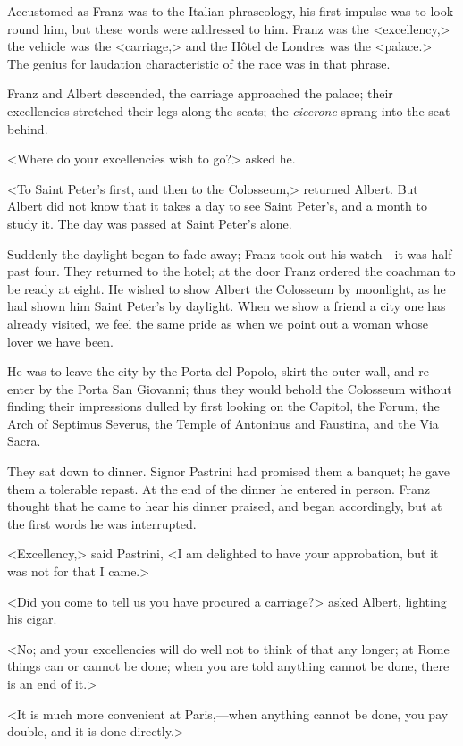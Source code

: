  Accustomed as Franz was to the Italian phraseology, his first impulse was to look round him, but these words were addressed to him. Franz was the <excellency,> the vehicle was the <carriage,> and the Hôtel de Londres was the <palace.> The genius for laudation characteristic of the race was in that phrase. 

 Franz and Albert descended, the carriage approached the palace; their excellencies stretched their legs along the seats; the \textit{cicerone} sprang into the seat behind. 

 <Where do your excellencies wish to go?> asked he. 

 <To Saint Peter's first, and then to the Colosseum,> returned Albert. But Albert did not know that it takes a day to see Saint Peter's, and a month to study it. The day was passed at Saint Peter's alone. 

 Suddenly the daylight began to fade away; Franz took out his watch—it was half-past four. They returned to the hotel; at the door Franz ordered the coachman to be ready at eight. He wished to show Albert the Colosseum by moonlight, as he had shown him Saint Peter's by daylight. When we show a friend a city one has already visited, we feel the same pride as when we point out a woman whose lover we have been. 

 He was to leave the city by the Porta del Popolo, skirt the outer wall, and re-enter by the Porta San Giovanni; thus they would behold the Colosseum without finding their impressions dulled by first looking on the Capitol, the Forum, the Arch of Septimus Severus, the Temple of Antoninus and Faustina, and the Via Sacra. 

 They sat down to dinner. Signor Pastrini had promised them a banquet; he gave them a tolerable repast. At the end of the dinner he entered in person. Franz thought that he came to hear his dinner praised, and began accordingly, but at the first words he was interrupted. 

 <Excellency,> said Pastrini, <I am delighted to have your approbation, but it was not for that I came.> 

 <Did you come to tell us you have procured a carriage?> asked Albert, lighting his cigar. 

 <No; and your excellencies will do well not to think of that any longer; at Rome things can or cannot be done; when you are told anything cannot be done, there is an end of it.> 

 <It is much more convenient at Paris,—when anything cannot be done, you pay double, and it is done directly.> 

